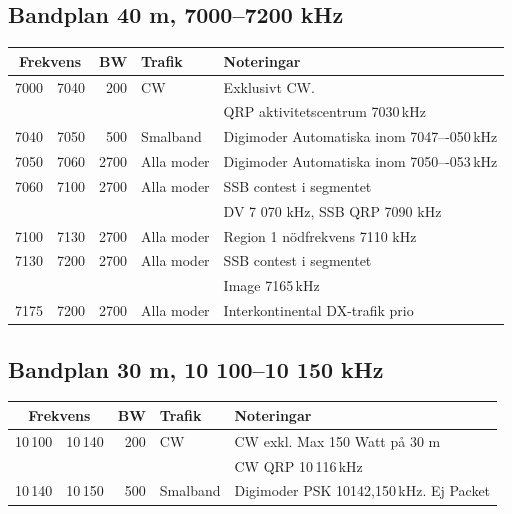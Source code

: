 \subsection*{Bandplan 40 m, 7000--7200 kHz}
\begin{tabular}{rrrll}
\multicolumn{2}{c}{\textbf{Frekvens}} & \textbf{BW} & \textbf{Trafik} & \textbf{Noteringar} \\ \hline
7000 & 7040 & 200  & CW         & Exklusivt CW.                             \\
     &      &      &            & QRP aktivitetscentrum 7030\,kHz           \\ \hline
7040 & 7050 & 500  & Smalband   & Digimoder Automatiska inom 7047–-050\,kHz \\ \hline
7050 & 7060 & 2700 & Alla moder & Digimoder Automatiska inom 7050–-053\,kHz \\ \hline
7060 & 7100 & 2700 & Alla moder & SSB contest i segmentet                   \\
     &      &      &            & DV 7 070 kHz, SSB QRP 7090 kHz            \\ \hline
7100 & 7130 & 2700 & Alla moder & Region 1 nödfrekvens 7110 kHz             \\ \hline
7130 & 7200 & 2700 & Alla moder & SSB contest i segmentet                   \\
     &      &      &            & Image 7165\,kHz                           \\ \hline
7175 & 7200 & 2700 & Alla moder & Interkontinental DX-trafik prio           \\ \hline
\end{tabular}

\subsection*{Bandplan 30 m, 10 100--10 150 kHz}
\begin{tabular}{rrrll}
\multicolumn{2}{c}{\textbf{Frekvens}} & \textbf{BW} & \textbf{Trafik} & \textbf{Noteringar} \\ \hline
10\,100 & 10\,140 & 200 & CW       & CW exkl. Max 150 Watt på 30 m           \\
        &         &     &          & CW QRP 10\,116\,kHz                     \\ \hline
10\,140 & 10\,150 & 500 & Smalband & Digimoder PSK 10142,150\,kHz. Ej Packet \\ \hline
\end{tabular}

